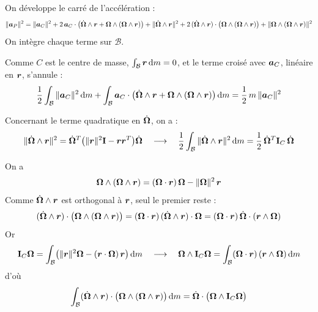 \begin{demonstration}
    On développe le carré de l'accélération :
    \[
        \|\bm{a}_P\|^2
        = \|\bm{a}_C\|^2
        + 2\,\bm{a}_C\cdot\bigl(\dot{\bm{\Omega}}\wedge\bm{r}
        + \bm{\Omega}\wedge(\bm{\Omega}\wedge\bm{r})\bigr)
        + \|\dot{\bm{\Omega}}\wedge\bm{r}\|^2
        + 2\,(\dot{\bm{\Omega}}\wedge\bm{r})\cdot
        \bigl(\bm{\Omega}\wedge(\bm{\Omega}\wedge\bm{r})\bigr)
        + \|\bm{\Omega}\wedge(\bm{\Omega}\wedge\bm{r})\|^2
    \]
    On intègre chaque terme sur $\mathcal{B}$.

    Comme $C$ est le centre de masse,
    $\int_{\mathcal{B}}\bm{r}\,\mathrm{d} m = 0$, et le terme croisé avec
    $\bm{a}_C$, linéaire en $\bm{r}$, s'annule :
    \[
        \frac12\int_{\mathcal{B}}\|\bm{a}_C\|^2\,\mathrm{d} m
        + \int_{\mathcal{B}}\bm{a}_C\cdot\bigl(\dot{\bm{\Omega}}
        \wedge\bm{r} + \bm{\Omega}\wedge(\bm{\Omega}\wedge
        \bm{r})\bigr)\,\mathrm{d} m
        = \frac12\,m\,\|\bm{a}_C\|^2
    \]

    Concernant le terme quadratique en $\dot{\bm{\Omega}}$, on a :
    \[
        \|\dot{\bm{\Omega}}\wedge\bm{r}\|^2
        = \dot{\bm{\Omega}}^T\bigl(\|\bm{r}\|^2\mathbf{I}
        - \bm{r}\bm{r}^T\bigr)\dot{\bm{\Omega}}
        \quad\longrightarrow\quad
        \frac12\int_{\mathcal{B}}\|\dot{\bm{\Omega}}\wedge\bm{r}\|^2
        \,\mathrm{d} m
        = \frac12\,\dot{\bm{\Omega}}^T\mathbf{I}_C\,\dot{\bm{\Omega}}
    \]

    On a
    \[
        \bm{\Omega}\wedge(\bm{\Omega}\wedge\bm{r})
        = (\bm{\Omega}\cdot\bm{r})\,\bm{\Omega}
        - \|\bm{\Omega}\|^2\,\bm{r}
    \]
    Comme $\dot{\bm{\Omega}}\wedge\bm{r}$ est orthogonal à
    $\bm{r}$, seul le premier reste :
    \[
        (\dot{\bm{\Omega}}\wedge\bm{r})\cdot
        \bigl(\bm{\Omega}\wedge(\bm{\Omega}\wedge\bm{r})\bigr)
        = (\bm{\Omega}\cdot\bm{r})\,
        (\dot{\bm{\Omega}}\wedge\bm{r})\cdot\bm{\Omega}
        = (\bm{\Omega}\cdot\bm{r})\,
        \dot{\bm{\Omega}}\cdot(\bm{r}\wedge\bm{\Omega})
    \]
    Or 
    \[
        \mathbf{I}_C\bm{\Omega}
        = \int_{\mathcal{B}}\bigl(\|\bm{r}\|^2\bm{\Omega}
        - (\bm{r}\cdot\bm{\Omega})\,\bm{r}\bigr)\,\mathrm{d} m
        \quad\longrightarrow\quad
        \bm{\Omega}\wedge\mathbf{I}_C\bm{\Omega}
        = \int_{\mathcal{B}}(\bm{\Omega}\cdot\bm{r})\,
        (\bm{r}\wedge\bm{\Omega})\,\mathrm{d} m
    \]
    d'où
    \[
        \int_{\mathcal{B}}(\dot{\bm{\Omega}}\wedge\bm{r})\cdot
        \bigl(\bm{\Omega}\wedge(\bm{\Omega}\wedge\bm{r})\bigr)
        \,\mathrm{d} m
        = \dot{\bm{\Omega}}\cdot\bigl(\bm{\Omega}\wedge
        \mathbf{I}_C\bm{\Omega}\bigr)
    \]


\end{demonstration}
